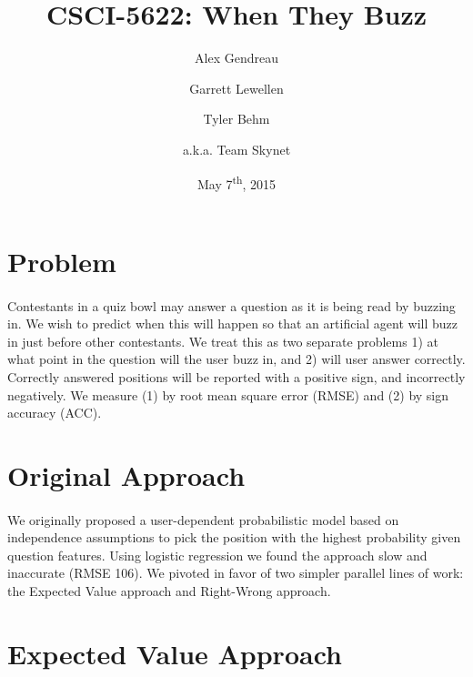 \documentclass[letterpaper]{article}
\begin{document}
\title{CSCI-5622: When They Buzz}
\author{Alex Gendreau \and Garrett Lewellen \and Tyler Behm \and a.k.a. Team Skynet}
\date{May 7\textsuperscript{th}, 2015}

\maketitle

\section*{Problem}

\paragraph{} Contestants in a quiz bowl may answer a question as it is being read by buzzing in. We wish to predict when this will happen so that an artificial agent will buzz in just before other contestants. We treat this as two separate problems 1) at what point in the question will the user buzz in, and 2) will user answer correctly. Correctly answered positions will be reported with a positive sign, and incorrectly negatively. We measure (1) by root mean square error (RMSE) and (2) by sign accuracy (ACC).

\section*{Original Approach}

\paragraph{} We originally proposed a user-dependent probabilistic model based on independence assumptions to pick the position with the highest probability given question features. Using logistic regression we found the approach slow and inaccurate (RMSE 106). We pivoted in favor of two simpler parallel lines of work: the Expected Value approach and Right-Wrong approach.

\section*{Expected Value Approach}
\end{document}
